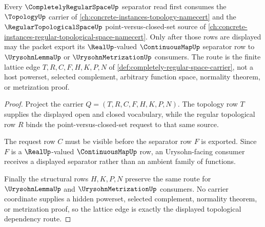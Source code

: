 \begin{theorem}
\label{thm:completely-regular-space-lattice-dependency-route}
Every $\CompletelyRegularSpaceUp$ separator read first consumes the $\TopologyUp$ carrier of \autoref{ch:concrete-instances-topology-namecert} and the $\RegularTopologicalSpaceUp$ point-versus-closed-set source of \autoref{ch:concrete-instances-regular-topological-space-namecert}. Only after those rows are displayed may the packet export its $\RealUp$-valued $\ContinuousMapUp$ separator row to $\UrysohnLemmaUp$ or $\UrysohnMetrizationUp$ consumers. The route is the finite lattice edge $T,R,C,F,H,K,P,N$ of \autoref{def:completely-regular-space-carrier}, not a host powerset, selected complement, arbitrary function space, normality theorem, or metrization proof.
\end{theorem}
\begin{proof}
Project the carrier $Q=(T,R,C,F,H,K,P,N)$. The topology row $T$ supplies the displayed open and closed vocabulary, while the regular topological row $R$ binds the point-versus-closed-set request to that same source.

The request row $C$ must be visible before the separator row $F$ is exported. Since $F$ is a $\RealUp$-valued $\ContinuousMapUp$ row, an Urysohn-facing consumer receives a displayed separator rather than an ambient family of functions.

Finally the structural rows $H,K,P,N$ preserve the same route for $\UrysohnLemmaUp$ and $\UrysohnMetrizationUp$ consumers. No carrier coordinate supplies a hidden powerset, selected complement, normality theorem, or metrization proof, so the lattice edge is exactly the displayed topological dependency route.
\end{proof}
